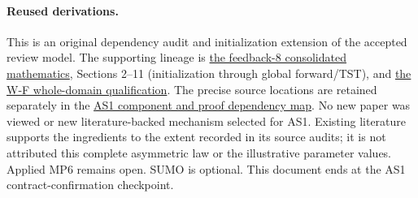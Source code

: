 \documentclass[11pt,a4paper]{article}
\begin{document}
\paragraph{Reused derivations.}
This is an original dependency audit and initialization extension of the
accepted review model. The supporting lineage is
\href{vsl_feedback8_full_mathematics.pdf}{the feedback-8 consolidated mathematics},
Sections 2--11 (initialization through global forward/TST), and
\href{vsl_wf_forward_qualification.pdf}{the W-F whole-domain qualification}.
The precise source locations are retained separately in the
\href{../../extraction/research_readiness/vsl_as1_initialization_proof_map.md}{AS1 component and proof dependency map}.
No new paper was viewed or new literature-backed mechanism selected for
AS1. Existing literature supports the ingredients to the extent recorded
in its source audits; it is not attributed this complete asymmetric law or
the illustrative parameter values. Applied MP6 remains open. SUMO is
optional. This document ends at the AS1 contract-confirmation checkpoint.
\end{document}
